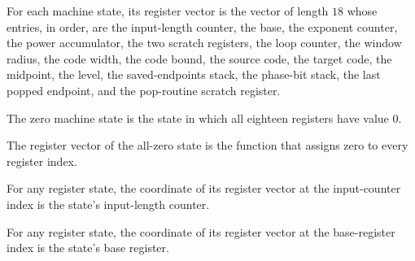\begin{definition}
\label{Complexity.LogProg.SavitchARM.St.toV}
\leanok
{}
For each machine state, its register vector is the vector of length $18$ whose entries,
in order, are the input-length counter, the base, the exponent counter, the power
accumulator, the two scratch registers, the loop counter, the window radius, the code
width, the code bound, the source code, the target code, the midpoint, the level, the
saved-endpoints stack, the phase-bit stack, the last popped endpoint, and the
pop-routine scratch register.
\end{definition}

\begin{definition}
\label{Complexity.LogProg.SavitchARM.St.zero}
\leanok
{}
The zero machine state is the state in which all eighteen registers have value $0$.
\end{definition}

\begin{lemma}
\label{Complexity.LogProg.SavitchARM.St.toV_zero}
\leanok
{}
The register vector of the all-zero state is the function that assigns zero to every
register index.
\end{lemma}

\begin{lemma}
\label{Complexity.LogProg.SavitchARM.St.toV_n}
\leanok
{}
For any register state, the coordinate of its register vector at the input-counter index
is the state's input-length counter.
\end{lemma}

\begin{lemma}
\label{Complexity.LogProg.SavitchARM.St.toV_a}
\leanok
{}
For any register state, the coordinate of its register vector at the base-register index
is the state's base register.
\end{lemma}

